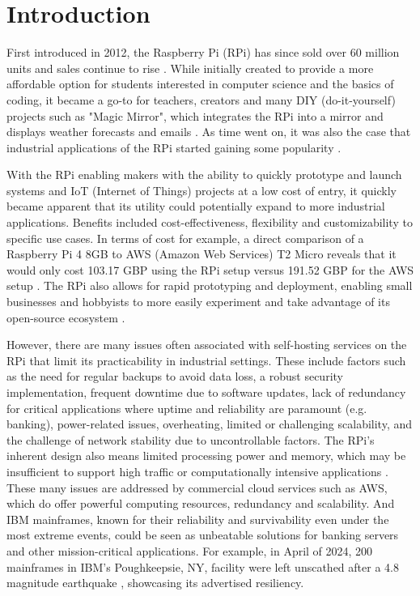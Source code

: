 \documentclass[conference]{IEEEtran}
\begin{document}

\section{\textbf{Introduction}}\label{intro}
First introduced in 2012, the Raspberry Pi (RPi) has since sold over 60 million units and sales continue to rise \cite{pi_sales}. While initially created to provide a more affordable option for students interested in computer science and the basics of coding, it became a go-to for teachers, creators and many DIY (do-it-yourself) projects such as "Magic Mirror", which integrates the RPi into a mirror and displays weather forecasts and emails \cite{magic_mirror}. As time went on, it was also the case that industrial applications of the RPi started gaining some popularity \cite{pi_history}.

With the RPi enabling makers with the ability to quickly prototype and launch systems and IoT (Internet of Things) projects at a low cost of entry, it quickly became apparent that its utility could potentially expand to more industrial applications. Benefits included cost-effectiveness, flexibility and customizability to specific use cases. In terms of cost for example, a direct comparison of a Raspberry Pi 4 8GB to AWS (Amazon Web Services) T2 Micro reveals that it would only cost 103.17 GBP using the RPi setup versus 191.52 GBP for the AWS setup \cite{pi_vs_AWS}. The RPi also allows for rapid prototyping and deployment, enabling small businesses and hobbyists to more easily experiment and take advantage of its open-source ecosystem \cite{pi_history}.

However, there are many issues often associated with self-hosting services on the RPi that limit its practicability in industrial settings. These include factors such as the need for regular backups to avoid data loss, a robust security implementation, frequent downtime due to software updates, lack of redundancy for critical applications where uptime and reliability are paramount (e.g. banking), power-related issues, overheating, limited or challenging scalability, and the challenge of network stability due to uncontrollable factors. The RPi's inherent design also means limited processing power and memory, which may be insufficient to support high traffic or computationally intensive applications \cite{pi_headaches,pi_website_hosting}. These many issues are addressed by commercial cloud services such as AWS, which do offer powerful computing resources, redundancy and scalability. And IBM mainframes, known for their reliability and survivability even under the most extreme events, could be seen as unbeatable solutions for banking servers and other mission-critical applications. For example, in April of 2024, 200 mainframes in IBM's Poughkeepsie, NY, facility were left unscathed after a 4.8 magnitude earthquake \cite{IBM_mainframes}, showcasing its advertised resiliency.
\end{document}
